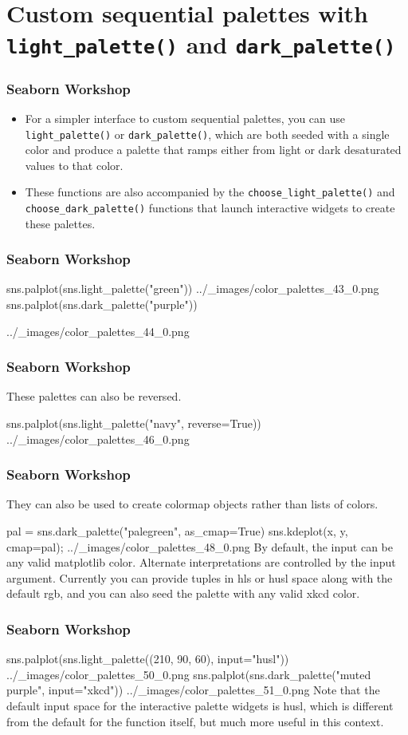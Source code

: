 \section{Custom sequential palettes with \texttt{light\_palette()} and \texttt{dark\_palette()}}
\begin{frame}[fragile]
	\frametitle{Seaborn Workshop}
	\large
\begin{itemize}
\item For a simpler interface to custom sequential palettes, you can use \texttt{light_palette()} or \texttt{dark_palette()}, which are both seeded with a single color and produce a palette that ramps either from light or dark desaturated values to that color. 
\item These functions are also accompanied by the \texttt{choose_light_palette()} and \texttt{choose_dark_palette()} functions that launch interactive widgets to create these palettes.
\end{itemize}

\end{frame}
\begin{frame}[fragile]
	\frametitle{Seaborn Workshop}
	\large
	
sns.palplot(sns.light_palette("green"))
../_images/color_palettes_43_0.png
sns.palplot(sns.dark_palette("purple"))

../_images/color_palettes_44_0.png
\end{frame}
\begin{frame}[fragile]
	\frametitle{Seaborn Workshop}
	\large
These palettes can also be reversed.

sns.palplot(sns.light_palette("navy", reverse=True))
../_images/color_palettes_46_0.png

\end{frame}
\begin{frame}[fragile]
\frametitle{Seaborn Workshop}
\large

They can also be used to create colormap objects rather than lists of colors.

pal = sns.dark_palette("palegreen", as_cmap=True)
sns.kdeplot(x, y, cmap=pal);
../_images/color_palettes_48_0.png
By default, the input can be any valid matplotlib color. Alternate interpretations are controlled by the input argument. Currently you can provide tuples in hls or husl space along with the default rgb, and you can also seed the palette with any valid xkcd color.
\end{frame}
\begin{frame}[fragile]
	\frametitle{Seaborn Workshop}
	\large
sns.palplot(sns.light_palette((210, 90, 60), input="husl"))
../_images/color_palettes_50_0.png
sns.palplot(sns.dark_palette("muted purple", input="xkcd"))
../_images/color_palettes_51_0.png
Note that the default input space for the interactive palette widgets is husl, which is different from the default for the function itself, but much more useful in this context.
\end{frame}


